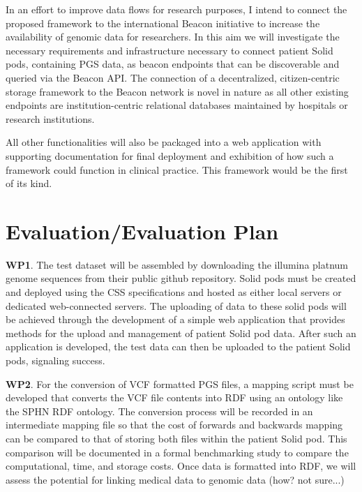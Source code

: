 \documentclass[runningheads]{llncs}
\begin{document}
In an effort to improve data flows for research purposes, I intend to connect the proposed framework to the international Beacon initiative \cite{rambla_beacon_2022} to increase the availability of genomic data for researchers. 
In this aim we will investigate the necessary requirements and infrastructure necessary to connect patient Solid pods, containing PGS data, as beacon endpoints that can be discoverable and queried via the Beacon API. 
The connection of a decentralized, citizen-centric storage framework to the Beacon network is novel in nature as all other existing endpoints are institution-centric relational databases maintained by hospitals or research institutions.

All other functionalities will also be packaged into a web application with supporting documentation for final deployment and exhibition of how such a framework could function in clinical practice.
This framework would be the first of its kind.

\section{Evaluation/Evaluation Plan}

\textbf{WP1}.
The test dataset will be assembled by downloading the illumina platnum genome sequences from their public github repository.
Solid pods must be created and deployed using the CSS specifications and hosted as either local servers or dedicated web-connected servers.
The uploading of data to these solid pods will be achieved through the development of a simple web application that provides methods for the upload and management of patient Solid pod data. 
After such an application is developed, the test data can then be uploaded to the patient Solid pods, signaling success.

\textbf{WP2}.
For the conversion of VCF formatted PGS files, a mapping script must be developed that converts the VCF file contents into RDF using an ontology like the SPHN RDF ontology. 
The conversion process will be recorded in an intermediate mapping file so that the cost of forwards and backwards mapping can be compared to that of storing both files within the patient Solid pod. 
This comparison will be documented in a formal benchmarking study to compare the computational, time, and storage costs.
Once data is formatted into RDF, we will assess the potential for linking medical data to genomic data (how? not sure...)
\end{document}
